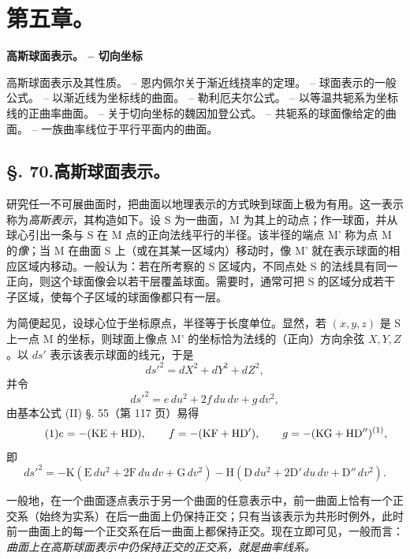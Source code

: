 \section*{第五章。}
\begin{center}
{\Large\bfseries 高斯球面表示。 -- 切向坐标}
\end{center}

\begin{center}\footnotesize
高斯球面表示及其性质。 -- 恩内佩尔关于渐近线挠率的定理。 -- 球面表示的一般公式。 -- 以渐近线为坐标线的曲面。 -- 勒利厄夫尔公式。 -- 以等温共轭系为坐标线的正曲率曲面。 -- 关于切向坐标的魏因加登公式。 -- 共轭系的球面像给定的曲面。 -- 一族曲率线位于平行平面内的曲面。
\end{center}

\subsection*{\S. 70.\quad 高斯球面表示。}

研究任一不可展曲面时，把曲面以地理表示的方式映到球面上极为有用。这一表示称为\emph{高斯表示}，其构造如下。设 S 为一曲面，M 为其上的动点；作一球面，并从球心引出一条与 S 在 M 点的正向法线平行的半径。该半径的端点 M' 称为点 M 的\emph{像}；当 M 在曲面 S 上（或在其某一区域内）移动时，像 M' 就在表示球面的相应区域内移动。一般认为：若在所考察的 S 区域内，不同点处 S 的法线具有同一正向，则这个球面像会以若干层覆盖球面。需要时，通常可把 S 的区域分成若干子区域，使每个子区域的球面像都只有一层。

为简便起见，设球心位于坐标原点，半径等于长度单位。显然，若 \((x,y,z)\) 是 S 上一点 M 的坐标，则球面上像点 M' 的坐标恰为法线的（正向）方向余弦 \(X,Y,Z\)。以 \(ds'\) 表示该表示球面的线元，于是
\[
 ds'^2=dX^2+dY^2+dZ^2,
\]
并令
\[
 ds'^2=e\,du^2+2f\,du\,dv+g\,dv^2,
\]
由基本公式 (II) \S. 55（第 117 页）易得
\begin{equation}\tag{1}
 e=-(\mathrm K\mathrm E+\mathrm H\mathrm D),\qquad
 f=-(\mathrm K\mathrm F+\mathrm H\mathrm D'),\qquad
 g=-(\mathrm K\mathrm G+\mathrm H\mathrm D'')\srcfnmark{1},
\end{equation}
即
\begin{equation}\tag{2}
 ds'^2=-\mathrm K(\mathrm E\,du^2+2\mathrm F\,du\,dv+\mathrm G\,dv^2)-\mathrm H(\mathrm D\,du^2+2\mathrm D'\,du\,dv+\mathrm D''\,dv^2).
\end{equation}

一般地，在一个曲面逐点表示于另一个曲面的任意表示中，前一曲面上恰有一个正交系（始终为实系）在后一曲面上仍保持正交；只有当该表示为共形时例外，此时前一曲面上的每一个正交系在后一曲面上都保持正交。现在立即可见，一般而言：\emph{曲面上在高斯球面表示中仍保持正交的正交系，就是曲率线系。}


